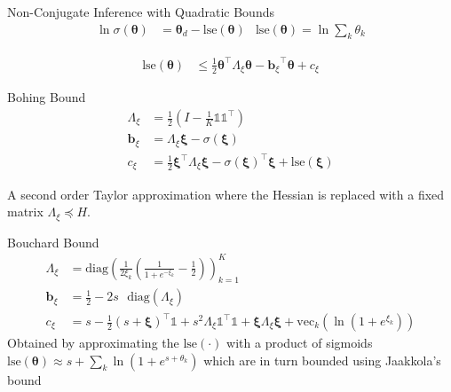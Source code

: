 \documentclass[xcolor=dvipsnames]{beamer}
\newcommand \halve[1] {
	\frac{#1}{2}
}
\newcommand \half {
    \halve{1}
}
\newcommand \T { ^\top }
\newcommand \vv[1] { \boldsymbol #1 }
\newcommand \diag[1] { \text{diag} \left( {#1} \right) }
\newcommand \Axi { { \Lambda_{\xi} } }
\newcommand \bxi { { \vv{b}_{\xi} } }
\newcommand \cxi { { c_{\xi} } }
\newcommand \thd[0]  { { \vv \theta_d } }
\newcommand \one  {{  \mathds{1} }}
\newcommand \lse { \text{lse} }
\begin{document}
\begin{frame}{Non-Conjugate Inference with Quadratic Bounds}
 {
    \begin{align*}
    \ln \sigma(\vv{\theta}) & = \thd - \lse(\vv{\theta}) & \lse(\vv{\theta}) = \ln \sum_k \theta_{k}
    \end{align*}
}

 {
    \begin{align*}
    \lse(\vv{\theta}) & \leq \half \vv{\theta}\T \Axi \vv{\theta} - \bxi\T\vv{\theta} + \cxi
    \end{align*}
}

 {
    Bohing Bound\cite{Bohning1988a}
    \begin{align*}
    \Axi & = \half \left( I - \frac{1}{K}\one \one\T \right) \\
    \bxi & = \Axi \vv{\xi} - \sigma(\vv{\xi})\\
    \cxi & = \half \vv{\xi}\T \Axi \vv{\xi} - \sigma(\vv{\xi})\T\vv{\xi} + \lse(\vv{\xi})
    \end{align*}
    
    A second order Taylor approximation where the Hessian is replaced with a fixed matrix $\Axi \preceq H$.
}

 {
    Bouchard Bound\cite{Bouchard2007}
    \begin{align*}
    \Axi & = \diag{\frac{1}{2\xi_k} \left( \frac{1}{1 + e^{-\xi_k}} - \half\right) }_{k=1}^K  \\
    \bxi & = \half - 2 s \text{ }\diag{\Axi} \\
    \cxi & = s - \half (s + \vv{\xi})\T\one + s^2\Axi \one\T\one + \vv{\xi}\Axi\vv{\xi} + \text{vec}_k(\ln (1 + e^{\xi_k}))
    \end{align*}
Obtained by approximating the $\lse(\cdot)$ with a product of sigmoids $\lse(\vv{\theta}) \approx s + \sum_k \ln (1 + e^{s + \theta_k})$ which are in turn bounded using Jaakkola's bound\cite{Jaakkola1997}
}

\end{frame}
\end{document}
